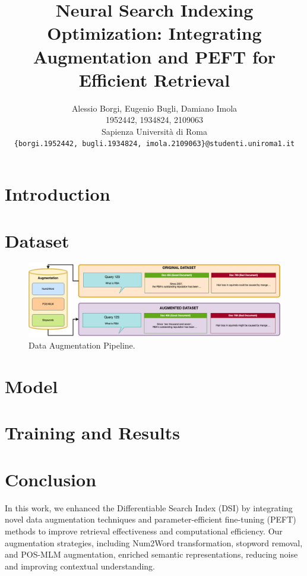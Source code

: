 \documentclass{article}
\title{Neural Search Indexing Optimization: Integrating Augmentation and PEFT for Efficient Retrieval}
\author{
  Alessio Borgi, Eugenio Bugli, Damiano Imola \\
  1952442, 1934824, 2109063 \\
  Sapienza Università di Roma \\
  \texttt{\{borgi.1952442, bugli.1934824, imola.2109063\}@studenti.uniroma1.it} \\
}
\begin{document}
\maketitle

\begin{abstract}

\end{abstract}


\section{Introduction} 
\section{Dataset} 
\begin{figure}
  \centering
  \includegraphics[width=\textwidth]{figs/dataset.png}
  \caption{Data Augmentation Pipeline.}
  \label{fig:fig1}
\end{figure}
\section{Model} 
\section{Training and Results} 



\section{Conclusion}
In this work, we enhanced the Differentiable Search Index (DSI) by integrating novel data augmentation techniques and parameter-efficient fine-tuning (PEFT) methods to improve retrieval effectiveness and computational efficiency. Our augmentation strategies, including Num2Word transformation, stopword removal, and POS-MLM augmentation, enriched semantic representations, reducing noise and improving contextual understanding. 
\end{document}
